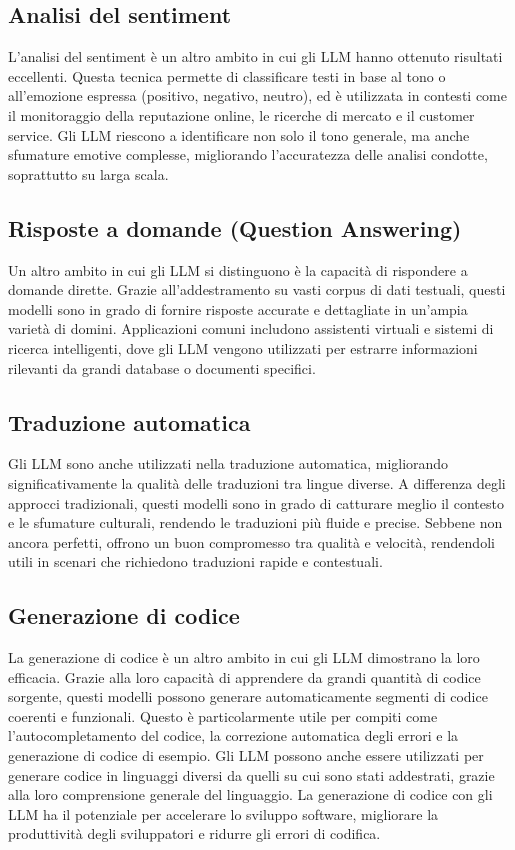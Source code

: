 \documentclass[target=mst,aauheader=,style=]{thud}
\begin{document}
\subsection{Analisi del sentiment}
L'analisi del sentiment è un altro ambito in cui gli LLM hanno ottenuto risultati eccellenti. Questa tecnica permette di classificare testi in base al tono o all'emozione espressa (positivo, negativo, neutro), ed è utilizzata in contesti come il monitoraggio della reputazione online, le ricerche di mercato e il customer service. Gli LLM riescono a identificare non solo il tono generale, ma anche sfumature emotive complesse, migliorando l'accuratezza delle analisi condotte, soprattutto su larga scala.

\subsection{Risposte a domande (Question Answering)}
Un altro ambito in cui gli LLM si distinguono è la capacità di rispondere a domande dirette. Grazie all’addestramento su vasti corpus di dati testuali, questi modelli sono in grado di fornire risposte accurate e dettagliate in un'ampia varietà di domini. Applicazioni comuni includono assistenti virtuali e sistemi di ricerca intelligenti, dove gli LLM vengono utilizzati per estrarre informazioni rilevanti da grandi database o documenti specifici.

\subsection{Traduzione automatica}
Gli LLM sono anche utilizzati nella traduzione automatica, migliorando significativamente la qualità delle traduzioni tra lingue diverse. A differenza degli approcci tradizionali, questi modelli sono in grado di catturare meglio il contesto e le sfumature culturali, rendendo le traduzioni più fluide e precise. Sebbene non ancora perfetti, offrono un buon compromesso tra qualità e velocità, rendendoli utili in scenari che richiedono traduzioni rapide e contestuali.

\subsection{Generazione di codice}
La generazione di codice è un altro ambito in cui gli LLM dimostrano la loro efficacia. Grazie alla loro capacità di apprendere da grandi quantità di codice sorgente, questi modelli possono generare automaticamente segmenti di codice coerenti e funzionali. Questo è particolarmente utile per compiti come l'autocompletamento del codice, la correzione automatica degli errori e la generazione di codice di esempio. Gli LLM possono anche essere utilizzati per generare codice in linguaggi diversi da quelli su cui sono stati addestrati, grazie alla loro comprensione generale del linguaggio. La generazione di codice con gli LLM ha il potenziale per accelerare lo sviluppo software, migliorare la produttività degli sviluppatori e ridurre gli errori di codifica.
\end{document}
